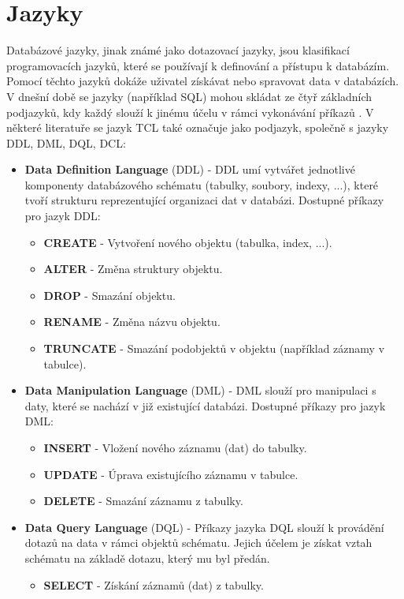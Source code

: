 \section{Jazyky} \label{sec:jazyky}
Databázové jazyky, jinak známé jako dotazovací jazyky, jsou klasifikací programovacích jazyků, které se používají k definování a přístupu k databázím. Pomocí těchto jazyků dokáže uživatel získávat nebo spravovat data v databázích. V dnešní době se jazyky (například \gls{SQL}) mohou skládat ze čtyř základních podjazyků, kdy každý slouží k jinému účelu v rámci vykonávání příkazů \cite{indeedDBLanguage, bookLanguages}. V některé literatuře se jazyk TCL také označuje jako podjazyk, společně s jazyky DDL, DML, DQL, DCL:
\begin{itemize}
\item \textbf{Data Definition Language} (DDL) - DDL umí vytvářet jednotlivé komponenty databázového schématu (tabulky, soubory, indexy, ...), které tvoří strukturu reprezentující organizaci dat v databázi. Dostupné příkazy pro jazyk DDL:
	\begin{itemize}
	\item \textbf{CREATE} - Vytvoření nového objektu (tabulka, index, ...).
	\item \textbf{ALTER} - Změna struktury objektu.
	\item \textbf{DROP} - Smazání objektu.
	\item \textbf{RENAME} - Změna názvu objektu.
	\item \textbf{TRUNCATE} - Smazání podobjektů v objektu (například záznamy v tabulce).
	\end{itemize}

\item \textbf{Data Manipulation Language} (DML) - DML slouží pro manipulaci s daty, které se nachází v již existující databázi. Dostupné příkazy pro jazyk DML:
	\begin{itemize}
	\item \textbf{INSERT} - Vložení nového záznamu (dat) do tabulky.
	\item \textbf{UPDATE} - Úprava existujícího záznamu v tabulce.
	\item \textbf{DELETE} - Smazání záznamu z tabulky.
	\end{itemize}

\item \textbf{Data Query Language} (DQL) - Příkazy jazyka DQL slouží k provádění dotazů na data v rámci objektů schématu. Jejich účelem je získat vztah schématu na základě dotazu, který mu byl předán.
	\begin{itemize}
	\item \textbf{SELECT} - Získání záznamů (dat) z tabulky.
	\end{itemize}


\end{itemize}
